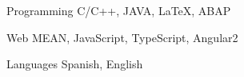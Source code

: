 


\begin{cvskills}


\cvskill
{Programming} %
{C/C++, JAVA, \LaTeX{}, ABAP} %


\cvskill
{Web} %
{MEAN, JavaScript, TypeScript, Angular2} %


\cvskill
{Languages} %
{Spanish, English} %


\end{cvskills}
